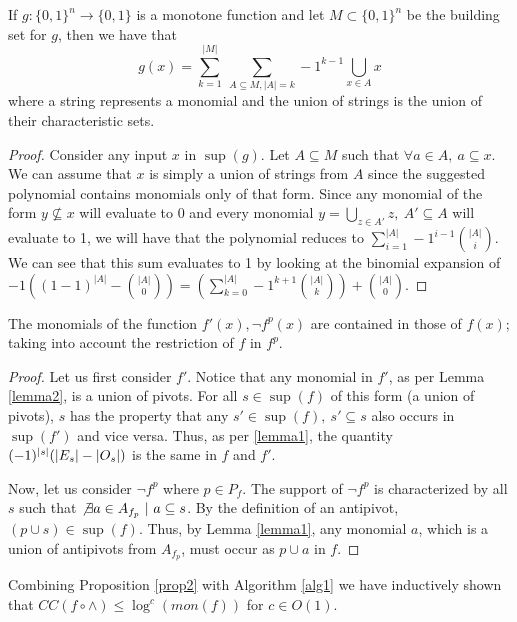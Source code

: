 \begin{lemma}\label{lemma2}
	If $g:\{0, 1\}^n \rightarrow \{0, 1\}$ is a monotone function and let $M \subset \{0,1\}^n$ be the building set for $g$, then we have that $$g(x) = \sum_{k=1}^{|M|} \ \sum_{A \subseteq M, |A| = k} -1^{k-1} \bigcup_{x \in A} x$$ where a string represents a monomial and the union of strings is the union of their characteristic sets.

	\begin{proof}
		Consider any input $x$ in $\sup(g)$. Let $A \subseteq M$ such that $\forall a \in A, \ a \subseteq x$. We can assume that $x$ is simply a union of strings from $A$ since the suggested polynomial contains monomials only of that form. Since any monomial of the form $y \not \subseteq x$ will evaluate to 0 and every monomial $y = \bigcup_{z \in A'}z, \ A' \subseteq A$ will evaluate to 1, we will have that the polynomial reduces to $\sum_{i=1}^{|A|} -1^{i-1} \binom{|A|}{i}$. We can see that this sum evaluates to 1 by looking at the binomial expansion of  \\ $ -1((1 - 1)^{|A|} - \binom{|A|}{0}) = (\sum_{k = 0}^{|A|} -1^{k+1} \binom{|A|}{k}) + \binom{|A|}{0}$.
	\end{proof}

\end{lemma}

\begin{proposition}\label{prop2}
	The monomials of the function $f'(x), \neg f^p(x)$ are contained in those of $f(x)$; taking into account the restriction of $f$ in $f^p$. 
	\begin{proof}
		Let us first consider $f'$. Notice that any monomial in $f'$, as per Lemma \ref{lemma2}, is a union of pivots. For all $s \in \sup(f)$ of this form (a union of pivots), $s$ has the property that any $s' \in \sup(f), \ s' \subseteq s$ also occurs in $\sup(f')$ and vice versa. Thus, as per \ref{lemma1}, the quantity $(-1)^{\vert s\vert}(\vert E_s\vert - \vert O_s\vert)$ is the same in $f$ and $f'$. 

		Now, let us consider $\neg f^p$ where $p \in P_f$. The support of $\neg f^p$ is characterized by all $s$ such that $\not \exists a \in A_{f_p} \ | \ a \subseteq s$. By the definition of an antipivot, $(p \cup s) \in \sup(f)$. Thus, by Lemma \ref{lemma1}, any monomial $a$, which is a union of antipivots from $A_{f_p}$, must occur as $p \cup a$ in $f$. 
	\end{proof}
\end{proposition}


Combining Proposition \ref{prop2} with Algorithm \ref{alg1} we have inductively shown that $CC(f \circ \wedge) \leq \log^c(mon(f))$ for $c \in O(1)$. 